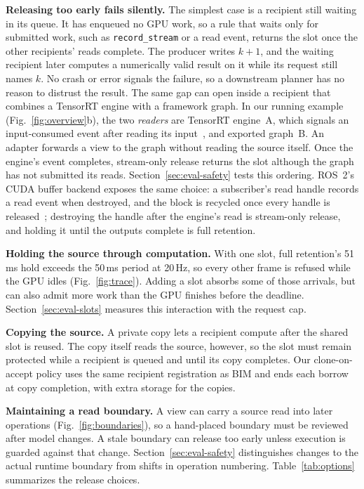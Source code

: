 \documentclass[conference]{IEEEtran}
\newcommand{\code}[1]{\texttt{#1}}
\newcommand{\ms}{\,ms}
\newcommand{\Hz}{\,Hz}
\begin{document}
\textbf{Releasing too early fails silently.} The simplest case is a recipient still waiting in its queue. It has enqueued no GPU work, so a rule that waits only for submitted work, such as \code{record\_stream} or a read event, returns the slot once the other recipients' reads complete. The producer writes $k{+}1$, and the waiting recipient later computes a numerically valid result on it while its request still names $k$. No crash or error signals the failure, so a downstream planner has no reason to distrust the result. The same gap can open inside a recipient that combines a TensorRT engine with a framework graph. In our running example (Fig.~\ref{fig:overview}b), the two \emph{readers} are TensorRT engine~A, which signals an input-consumed event after reading its input~\cite{tensorrt}, and exported graph~B. An adapter forwards a view to the graph without reading the source itself. Once the engine's event completes, stream-only release returns the slot although the graph has not submitted its reads. Section~\ref{sec:eval-safety} tests this ordering. ROS~2's CUDA buffer backend exposes the same choice: a subscriber's read handle records a read event when destroyed, and the block is recycled once every handle is released~\cite{cudabackend}; destroying the handle after the engine's read is stream-only release, and holding it until the outputs complete is full retention.

\textbf{Holding the source through computation.} With one slot, full retention's 51\ms{} hold exceeds the 50\ms{} period at 20\Hz, so every other frame is refused while the GPU idles (Fig.~\ref{fig:trace}). Adding a slot absorbs some of those arrivals, but can also admit more work than the GPU finishes before the deadline. Section~\ref{sec:eval-slots} measures this interaction with the request cap.

\textbf{Copying the source.} A private copy lets a recipient compute after the shared slot is reused. The copy itself reads the source, however, so the slot must remain protected while a recipient is queued and until its copy completes. Our clone-on-accept policy uses the same recipient registration as BIM and ends each borrow at copy completion, with extra storage for the copies.

\textbf{Maintaining a read boundary.} A view can carry a source read into later operations (Fig.~\ref{fig:boundaries}), so a hand-placed boundary must be reviewed after model changes. A stale boundary can release too early unless execution is guarded against that change. Section~\ref{sec:eval-safety} distinguishes changes to the actual runtime boundary from shifts in operation numbering. Table~\ref{tab:options} summarizes the release choices.
\end{document}
